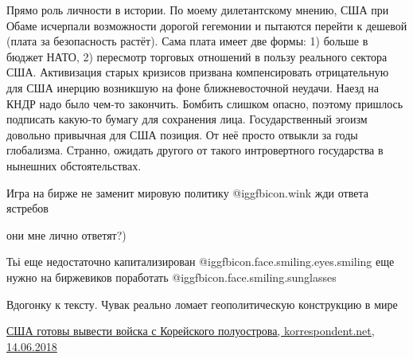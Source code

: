\begin{itemize}
\begin{itemize}
\end{itemize} %


Прямо роль личности в истории. По моему дилетантскому мнению, США при Обаме
исчерпали возможности дорогой гегемонии и пытаются перейти к дешевой (плата за
безопасность растёт). Сама плата имеет две формы: 1) больше в бюджет НАТО, 2)
пересмотр торговых отношений в пользу реального сектора США. Активизация старых
кризисов призвана компенсировать отрицательную для США инерцию возникшую на
фоне ближневосточной неудачи. Наезд на КНДР надо было чем-то закончить. Бомбить
слишком опасно, поэтому пришлось подписать какую-то бумагу для сохранения лица.
Государственный эгоизм довольно привычная для США позиция. От неё просто
отвыкли за годы глобализма. Странно, ожидать другого от такого интровертного
государства в нынешних обстоятельствах.


Игра на бирже не заменит мировую политику @igg{fbicon.wink}  жди ответа
ястребов

\begin{itemize} %
они мне лично ответят?)

Тьі еще недостаточно капитализирован @igg{fbicon.face.smiling.eyes.smiling}  еще нужно на биржевиков поработать @igg{fbicon.face.smiling.sunglasses} 
\end{itemize} %


Вдогонку к тексту. Чувак реально ломает геополитическую конструкцию в мире

\href{https://korrespondent.net/world/3980280-ssha-hotovy-vyvesty-voiska-s-koreiskoho-poluostrova}{%
США готовы вывести войска с Корейского полуострова, korrespondent.net, 14.06.2018%
}


\end{itemize} %
